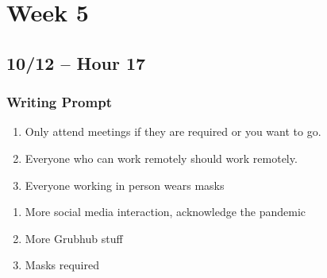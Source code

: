 \chapter{Week 5}

\section{10/12 -- Hour 17}

\subsection{Writing Prompt}

\begin{enumerate}
    \item Only attend meetings if they are required or you want to go.
    \item Everyone who can work remotely should work remotely.
    \item Everyone working in person wears masks
\end{enumerate}

\begin{enumerate}
    \item More social media interaction, acknowledge the pandemic
    \item More Grubhub stuff
    \item Masks required
\end{enumerate}